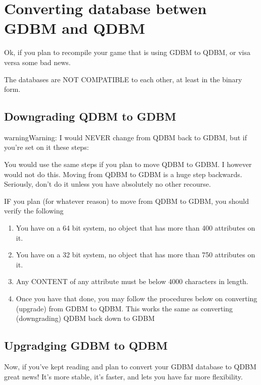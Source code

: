 \documentclass[letterpaper,10pt,english]{sphinxmanual}
\begin{document}
\section{Converting database betwen GDBM and QDBM}
\label{\detokenize{legacy:converting-database-betwen-gdbm-and-qdbm}}
\sphinxAtStartPar
Ok, if you plan to recompile your game that is using GDBM to QDBM, or visa versa
some bad news.

\sphinxAtStartPar
The databases are NOT COMPATIBLE to each other, at least in the binary form.


\subsection{Downgrading QDBM to GDBM}
\label{\detokenize{legacy:downgrading-qdbm-to-gdbm}}
\begin{sphinxadmonition}{warning}{Warning:}
\sphinxAtStartPar
I would NEVER change from QDBM back to GDBM, but if you’re set on it these steps:

\sphinxAtStartPar
You would use the same steps if you plan to move QDBM to GDBM.  I however would
not do this.  Moving from QDBM to GDBM is a huge step backwards.  Seriously,
don’t do it unless you have absolutely no other recourse.

\sphinxAtStartPar
IF you plan (for whatever reason) to move from QDBM to GDBM, you should verify
the following
\end{sphinxadmonition}
\begin{enumerate}
%
\item {} 
\sphinxAtStartPar
You have on a 64 bit system, no object that has more than 400 attributes on it.

\item {} 
\sphinxAtStartPar
You have on a 32 bit system, no object that has more than 750 attributes on it.

\item {} 
\sphinxAtStartPar
Any CONTENT of any attribute must be below 4000 characters in length.

\item {} 
\sphinxAtStartPar
Once you have that done, you may follow the procedures below on converting (upgrade) from GDBM to QDBM.  This works the same as converting (downgrading) QDBM back down to GDBM

\end{enumerate}


\subsection{Upgradging GDBM to QDBM}
\label{\detokenize{legacy:upgradging-gdbm-to-qdbm}}
\sphinxAtStartPar
Now, if you’ve kept reading and plan to convert your GDBM database to QDBM great news!
It’s more stable, it’s faster, and lets you have far more flexibility.
\end{document}
